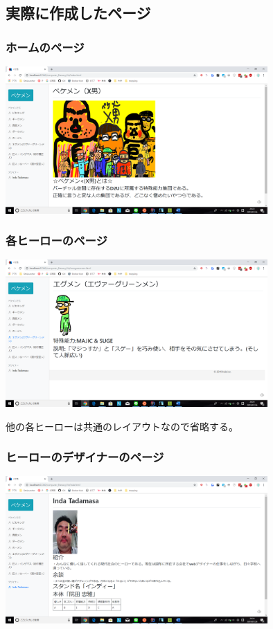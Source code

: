 \documentclass[12pt,a4j]{jarticle}
\begin{document}
\subsection{実際に作成したページ}

\subsubsection{ホームのページ}

\begin{center}
  \includegraphics[width=10cm]{./index.png}
\end{center}

\subsubsection{各ヒーローのページ}

\begin{center}
  \includegraphics[width=10cm]{./hero1.png}
\end{center}

他の各ヒーローは共通のレイアウトなので省略する。

\subsubsection{ヒーローのデザイナーのページ}

\begin{center}
  \includegraphics[width=10cm]{./designer.png}
\end{center}
\end{document}
